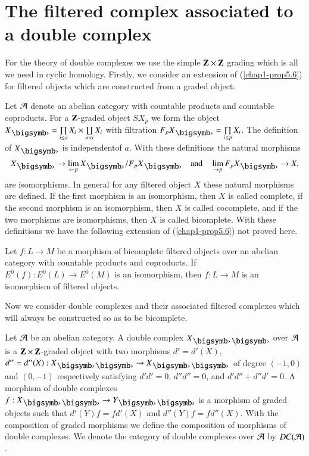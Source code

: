 \section{The filtered complex associated to a double
  complex}\label{chap1-sec6}

For the theory of double complexes we use the simple $\mathbf{Z}\times \mathbf{Z}$
grading which is all we need in cyclic homology. Firstly, we consider
an extension of (\ref{chap1-prop5.6}) for filtered objects which are
constructed from a graded object.

\begin{remark}\label{chap1-rem6.1}
Let $\mathcal{A}$ denote an abelian category with countable products and
countable coproducts. For a $\mathbf{Z}$-graded object $SX_{p}$ we form the
object $X_{\bigdot}=\prod\limits_{i\leq a}X_{i}\times
\coprod\limits_{a<i}X_{i}$ with filtration
$F_{p}X_{\bigdot}=\prod\limits_{i\leq p}X_{i}$. The definition of
$X_{\bigdot}$ is independent\pageoriginale of $a$. With these
definitions the natural morphisms
$$
X_{\bigdot}\to \lim\limits_{\leftarrow
  p}X_{\bigdot}/F_{p}X_{\bigdot}\q\text{and}\q \lim\limits_{\to
  p}F_{p}X_{\bigdot}\to X.
$$
are isomorphisms. In general for any filtered object $X$ these natural
morphisms are defined. If the first morphism is an isomorphism, then
$X$ is called complete, if the second morphism is an isomorphism, then
$X$ is called cocomplete, and if the two morphisms are isomorphisms,
then $X$ is called bicomplete. With these definitions we have the
following extension of (\ref{chap1-prop5.6}) not proved here.
\end{remark}

\begin{remark}\label{chap1-rem6.2}
Let $f:L\to M$ be a morphism of bicomplete filtered objects over an
abelian category with countable products and coproducts. If
$E^{0}(f):E^{0}(L)\to E^{0}(M)$ is an isomorphism, then $f:L\to M$ is
an isomorphism of filtered objects.
\end{remark}

Now we consider double complexes and their associated filtered
complexes which will always be constructed so as to be bicomplete.

\begin{definition}\label{chap1-defi6.3}
Let $\mathcal{A}$ be an abelian category. A double complex $X_{\bigdot\bigdot}$
over $\mathcal{A}$ is a $\mathbf{Z}\times \mathbf{Z}$-graded object with two morphisms
$d'=d'(X)$, $d''=d''(X):X_{\bigdot\bigdot}\to X_{\bigdot\bigdot}$ of
degree $(-1,0)$ and $(0,-1)$ respectively satisfying $d'd'=0$,
$d''d''=0$, and $d'd''+d''d'=0$. A morphism of double complexes
$f:X_{\bigdot\bigdot}\to Y_{\bigdot\bigdot}$ is a morphism of graded
objects such that $d'(Y)f=fd'(X)$ and $d''(Y)f=fd''(X)$. With the
composition of graded morphisms we define the composition of morphisms
of double complexes. We denote the category of double complexes over
$\mathcal{A}$ by $DC(\mathcal{A})$. 
\end{definition}

